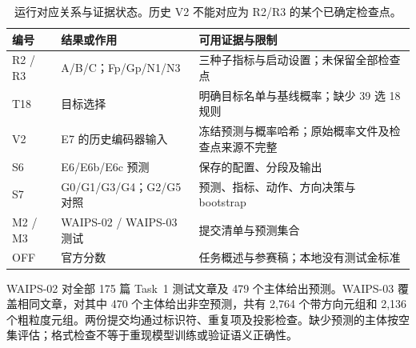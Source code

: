 \documentclass[12pt,a4paper]{article}
\begin{document}
\begin{table}[htbp]
\centering\small
\caption{运行对应关系与证据状态。历史 V2 不能对应为 R2/R3 的某个已确定检查点。}
\label{tab:evidence}
\begin{tabularx}{\textwidth}{@{}P{2.3cm}YY@{}}
\toprule
编号 & 结果或作用 & 可用证据与限制 \\
\midrule
R2 / R3 & A/B/C；Fp/Gp/N1/N3 & 三种子指标与启动设置；未保留全部检查点 \\
T18 & 目标选择 & 明确目标名单与基线概率；缺少 39 选 18 规则 \\
V2 & E7 的历史编码器输入 & 冻结预测与概率哈希；原始概率文件及检查点来源不完整 \\
S6 & E6/E6b/E6c 预测 & 保存的配置、分段及输出 \\
S7 & G0/G1/G3/G4；G2/G5 对照 & 预测、指标、动作、方向决策与 bootstrap \\
M2 / M3 & WAIPS-02 / WAIPS-03 测试 & 提交清单与预测集合 \\
OFF & 官方分数 & 任务概述与参赛稿；本地没有测试金标准 \\
\bottomrule
\end{tabularx}
\end{table}

WAIPS-02 对全部 175 篇 Task~1 测试文章及 479 个主体给出预测。WAIPS-03 覆盖相同文章，对其中 470 个主体给出非空预测，共有 2,764 个带方向元组和 2,136 个粗粒度元组。两份提交均通过标识符、重复项及投影检查。缺少预测的主体按空集评估；格式检查不等于重现模型训练或验证语义正确性。
\end{document}
